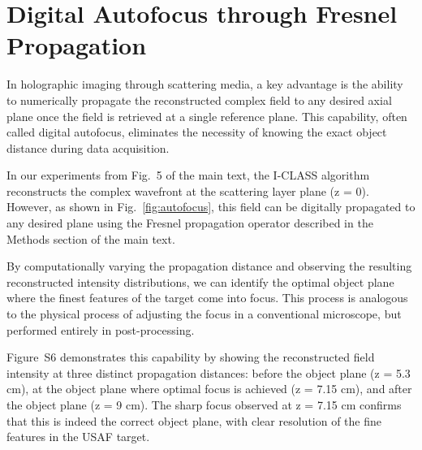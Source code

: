 \documentclass[pdflatex,sn-mathphys-num,Numbered]{sn-jnl}%
\theoremstyle{thmstyleone}%
\theoremstyle{thmstyletwo}%
\theoremstyle{thmstylethree}%
\begin{document}
\newpage

\section*{Digital Autofocus through Fresnel Propagation}
            
    In holographic imaging through scattering media, a key advantage is the ability to numerically propagate the reconstructed complex field to any desired axial plane once the field is retrieved at a single reference plane. This capability, often called digital autofocus, eliminates the necessity of knowing the exact object distance during data acquisition.
    
    In our experiments from Fig.~5 of the main text, the I-CLASS algorithm reconstructs the complex wavefront at the scattering layer plane (z = 0). However, as shown in Fig.~\ref{fig:autofocus}, this field can be digitally propagated to any desired plane using the Fresnel propagation operator described in the Methods section of the main text. 
    
    By computationally varying the propagation distance and observing the resulting reconstructed intensity distributions, we can identify the optimal object plane where the finest features of the target come into focus. This process is analogous to the physical process of adjusting the focus in a conventional microscope, but performed entirely in post-processing.
    
    Figure~S6 demonstrates this capability by showing the reconstructed field intensity at three distinct propagation distances: before the object plane (z = 5.3 cm), at the object plane where optimal focus is achieved (z = 7.15 cm), and after the object plane (z = 9 cm). The sharp focus observed at z = 7.15 cm confirms that this is indeed the correct object plane, with clear resolution of the fine features in the USAF target.
\end{document}
